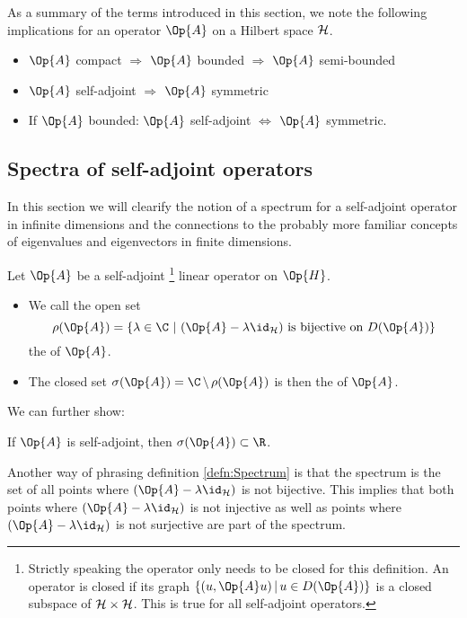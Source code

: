 \begin{rem}
	As a summary of the terms introduced in this section,
	we note the following implications for an operator $\Op{A}$
	on a Hilbert space $\mathcal{H}$.
	\begin{itemize}
		\item $\Op{A}$ compact
			$\Rightarrow$ $\Op{A}$ bounded $\Rightarrow$ $\Op{A}$ semi-bounded
		\item $\Op{A}$ self-adjoint $\Rightarrow$ $\Op{A}$ symmetric
		\item If $\Op{A}$ bounded: $\Op{A}$ self-adjoint $\Leftrightarrow$
			$\Op{A}$ symmetric.
	\end{itemize}
\end{rem}

\subsection{Spectra of self-adjoint operators}
In this section we will clearify the notion of a spectrum
for a self-adjoint operator in infinite dimensions
and the connections to the probably more familiar concepts
of eigenvalues and eigenvectors in finite dimensions.

\newcommand{\shiftop}{(\Op{A} - \lambda \id_{\hilbert})}
\begin{defn}
	\label{defn:Spectrum}
	Let $\Op{A}$ be a self-adjoint%
	\footnote{Strictly speaking the operator only needs to be closed for this definition.
	An operator is closed if its graph $\{ (u, \Op{A}u) \, | \, u \in D(\Op{A}) \}$
	is a closed subspace of $\mathcal{H} \times \mathcal{H}$.
	This is true for all self-adjoint operators.}
	linear operator on $\Op{H}$.
	\begin{itemize}
		\item We call the open set
			\[ \rho(\Op{A}) = \left\{ \lambda \in \C \ \middle| \
				\shiftop \
				\text{is bijective on $D(\Op{A})$} \right\} \]
			the  of $\Op{A}$.
		\item The closed set $\sigma(\Op{A}) = \C \, \backslash \, \rho(\Op{A})$
			is then the \newterm{spectrum} of $\Op{A}$.
	\end{itemize}
\end{defn}

\noindent
We can further show:~\cite[p. 102]{Helffer2013}
\begin{prop}
	If $\Op{A}$ is self-adjoint, then $\sigma(\Op{A}) \subset \R$.
\end{prop}

Another way of phrasing definition \vref{defn:Spectrum} is that
the spectrum is the set of all points where $\shiftop$ is not bijective.
This implies that both points where $\shiftop$ is not injective
as well as points where $\shiftop$ is not surjective are part of the spectrum.

